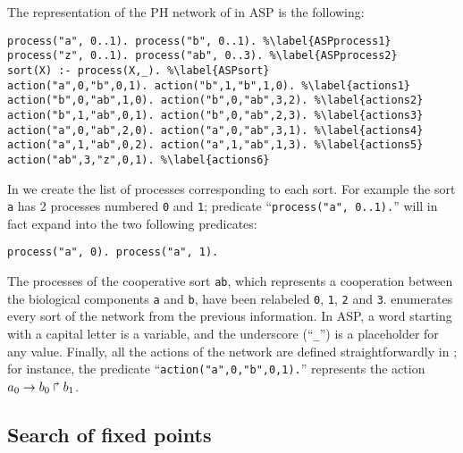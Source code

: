 \begin{example}
\label{ex:asp-ph}
The representation of the PH network of  in ASP is the following:
\begin{lstlisting}
process("a", 0..1). process("b", 0..1). %\label{ASPprocess1}
process("z", 0..1). process("ab", 0..3). %\label{ASPprocess2}
sort(X) :- process(X,_). %\label{ASPsort}
action("a",0,"b",0,1). action("b",1,"b",1,0). %\label{actions1}
action("b",0,"ab",1,0). action("b",0,"ab",3,2). %\label{actions2}
action("b",1,"ab",0,1). action("b",0,"ab",2,3). %\label{actions3}
action("a",0,"ab",2,0). action("a",0,"ab",3,1). %\label{actions4}
action("a",1,"ab",0,2). action("a",1,"ab",1,3). %\label{actions5}
action("ab",3,"z",0,1). %\label{actions6}
\end{lstlisting}
In  we create the list of processes corresponding to each sort.
For example the sort \texttt{a} has 2 processes numbered \texttt{0} and \texttt{1};
predicate ``\texttt{process("a", 0..1).}'' will in fact expand into the two following predicates:
\begin{lstlisting}[numbers=none]
process("a", 0). process("a", 1).
\end{lstlisting}
The processes of the cooperative sort \texttt{ab},
which represents a cooperation between the biological components \texttt{a} and \texttt{b},
have been relabeled \texttt{0}, \texttt{1}, \texttt{2} and \texttt{3}.
 enumerates every sort of the network from the previous information.
In ASP, a word starting with a capital letter is a variable,
and the underscore (``\texttt{\_}'') is a placeholder for any value.
Finally, all the actions of the network are defined straightforwardly in ;
for instance, the predicate ``\texttt{action("a",0,"b",0,1).}'' represents the action
$a_0\rightarrow b_0\Rsh b_1$.
\end{example}

\subsection{Search of fixed points}

